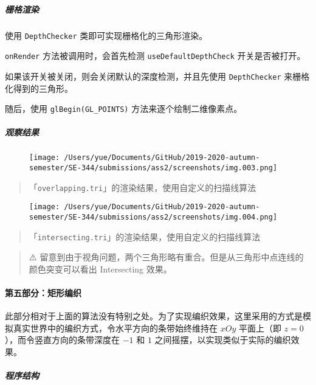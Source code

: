 \documentclass[
]{article}
\begin{document}
\hypertarget{header-n315}{%
\subparagraph{栅格渲染}\label{header-n315}}

使用 \texttt{DepthChecker} 类即可实现栅格化的三角形渲染。

\texttt{onRender} 方法被调用时，会首先检测 \texttt{useDefaultDepthCheck}
开关是否被打开。

如果该开关被关闭，则会关闭默认的深度检测，并且先使用
\texttt{DepthChecker} 来栅格化得到的三角形。

随后，使用 \texttt{glBegin(GL\_POINTS)} 方法来逐个绘制二维像素点。

\hypertarget{header-n326}{%
\subparagraph{观察结果}\label{header-n326}}

\begin{figure}
\centering
\texttt{[image: /Users/yue/Documents/GitHub/2019-2020-autumn-semester/SE-344/submissions/ass2/screenshots/img.003.png]}
\caption{}
\end{figure}

\begin{quote}
「\texttt{overlapping.tri}」的渲染结果，使用自定义的扫描线算法
\end{quote}

\begin{figure}
\centering
\texttt{[image: /Users/yue/Documents/GitHub/2019-2020-autumn-semester/SE-344/submissions/ass2/screenshots/img.004.png]}
\caption{}
\end{figure}

\begin{quote}
「\texttt{intersecting.tri}」的渲染结果，使用自定义的扫描线算法
\end{quote}

\begin{quote}
⚠️
留意到由于视角问题，两个三角形略有重合。但是从三角形中点连线的颜色突变可以看出
Intersecting 效果。
\end{quote}

\hypertarget{header-n343}{%
\paragraph{第五部分：矩形编织}\label{header-n343}}

此部分相对于上面的算法没有特别之处。为了实现编织效果，这里采用的方式是模拟真实世界中的编织方式，令水平方向的条带始终维持在
\(xOy\) 平面上（即 \(z = 0\)），而令竖直方向的条带深度在 \(-1\) 和 \(1\)
之间摇摆，以实现类似于实际的编织效果。

\hypertarget{header-n347}{%
\subparagraph{程序结构}\label{header-n347}}
\end{document}
